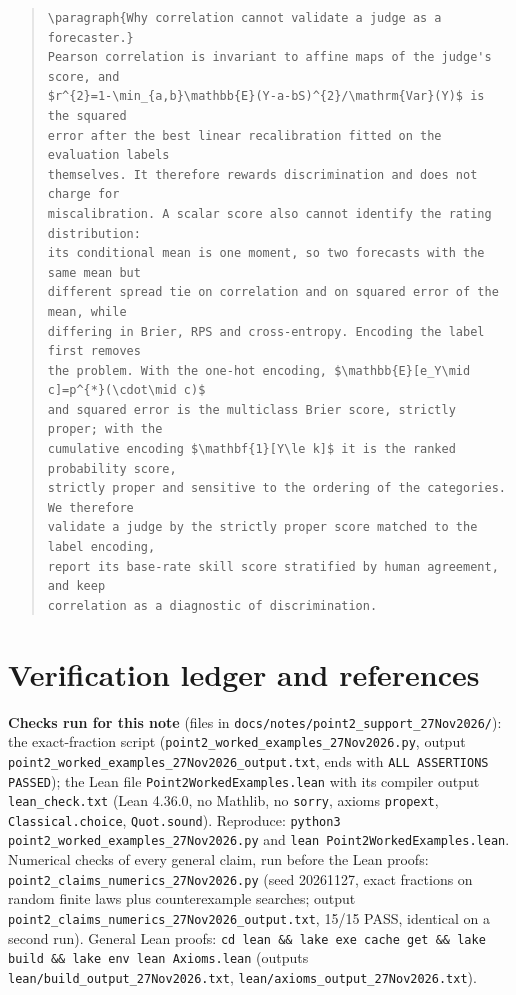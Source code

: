 \documentclass[11pt]{article}
\theoremstyle{remark}
\theoremstyle{definition}
\newcommand{\1}{\mathbf{1}}
\newcommand{\file}[1]{\nolinkurl{#1}}
\begin{document}
\begin{quote}
\small
\begin{verbatim}
\paragraph{Why correlation cannot validate a judge as a forecaster.}
Pearson correlation is invariant to affine maps of the judge's score, and
$r^{2}=1-\min_{a,b}\mathbb{E}(Y-a-bS)^{2}/\mathrm{Var}(Y)$ is the squared
error after the best linear recalibration fitted on the evaluation labels
themselves. It therefore rewards discrimination and does not charge for
miscalibration. A scalar score also cannot identify the rating distribution:
its conditional mean is one moment, so two forecasts with the same mean but
different spread tie on correlation and on squared error of the mean, while
differing in Brier, RPS and cross-entropy. Encoding the label first removes
the problem. With the one-hot encoding, $\mathbb{E}[e_Y\mid c]=p^{*}(\cdot\mid c)$
and squared error is the multiclass Brier score, strictly proper; with the
cumulative encoding $\mathbf{1}[Y\le k]$ it is the ranked probability score,
strictly proper and sensitive to the ordering of the categories. We therefore
validate a judge by the strictly proper score matched to the label encoding,
report its base-rate skill score stratified by human agreement, and keep
correlation as a diagnostic of discrimination.
\end{verbatim}
\end{quote}

\section{Verification ledger and references}
\label{sec:ledger}

\textbf{Checks run for this note} (files in \file{docs/notes/point2\_support\_27Nov2026/}): the exact-fraction script (\file{point2\_worked\_examples\_27Nov2026.py}, output \file{point2\_worked\_examples\_27Nov2026\_output.txt}, ends with \texttt{ALL ASSERTIONS PASSED}); the Lean file \file{Point2WorkedExamples.lean} with its compiler output \file{lean\_check.txt} (Lean 4.36.0, no Mathlib, no \texttt{sorry}, axioms \texttt{propext}, \texttt{Classical.choice}, \texttt{Quot.sound}). Reproduce: \texttt{python3 point2\_worked\_examples\_27Nov2026.py} and \texttt{lean Point2WorkedExamples.lean}. Numerical checks of every general claim, run before the Lean proofs: \file{point2\_claims\_numerics\_27Nov2026.py} (seed 20261127, exact fractions on random finite laws plus counterexample searches; output \file{point2\_claims\_numerics\_27Nov2026\_output.txt}, 15/15 PASS, identical on a second run). General Lean proofs: \texttt{cd lean \&\& lake exe cache get \&\& lake build \&\& lake env lean Axioms.lean} (outputs \file{lean/build\_output\_27Nov2026.txt}, \file{lean/axioms\_output\_27Nov2026.txt}).
\end{document}
